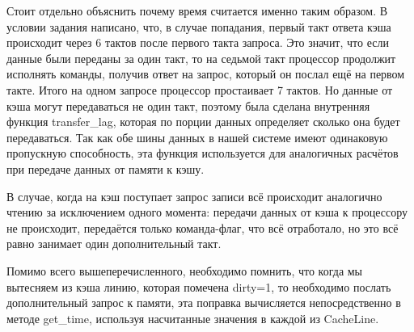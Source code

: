 \documentclass[14pt, russian, onesize]{extreport}
\begin{document}
Стоит отдельно объяснить почему время считается именно таким образом.
В условии задания написано, что, в случае попадания,
первый такт ответа кэша происходит
через 6 тактов после первого такта запроса. Это значит, что 
если данные были переданы за один такт, то на седьмой
такт процессор продолжит исполнять команды, получив ответ
на запрос, который он послал ещё на первом такте. Итого на
одном запросе процессор простаивает 7 тактов. Но данные
от кэша могут передаваться не один такт, поэтому была
сделана внутренняя функция transfer\_lag, которая по порции
данных определяет сколько она будет передаваться.
Так как обе шины данных в нашей системе имеют одинаковую
пропускную способность, эта функция используется для 
аналогичных расчётов при передаче данных от 
памяти к кэшу. 

В случае, когда на кэш поступает запрос записи всё происходит
аналогично чтению за исключением одного момента:
передачи данных от кэша к процессору не происходит,
передаётся только команда-флаг, что всё отработало,
но это всё равно занимает один дополнительный такт.

Помимо всего вышеперечисленного, необходимо помнить, что
когда мы вытесняем из кэша линию, которая помечена dirty=1,
то необходимо послать дополнительный запрос к памяти, эта
поправка вычисляется непосредственно в методе 
get\_time, используя насчитанные значения в каждой из CacheLine.
\end{document}
